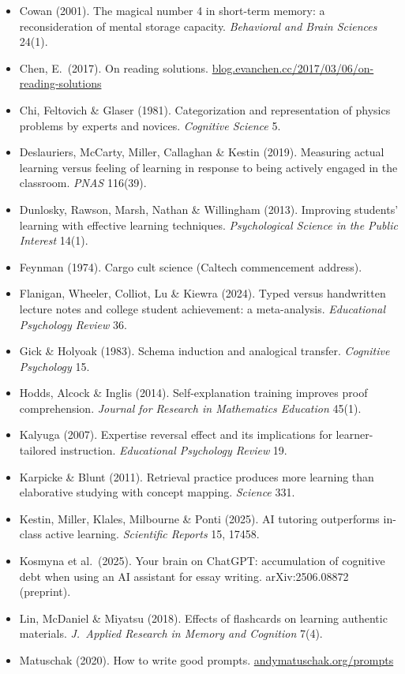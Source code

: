 \documentclass{kaelearn}
\newcommand\src[1]{\url{#1}}
\begin{document}
{\begin{itemize}
\item Cowan (2001). The magical number 4 in short-term memory: a reconsideration of mental storage capacity. \emph{Behavioral and Brain Sciences} 24(1).
\item Chen, E.\ (2017). On reading solutions. \src{blog.evanchen.cc/2017/03/06/on-reading-solutions}
\item Chi, Feltovich \& Glaser (1981). Categorization and representation of physics problems by experts and novices. \emph{Cognitive Science} 5.
\item Deslauriers, McCarty, Miller, Callaghan \& Kestin (2019). Measuring actual learning versus feeling of learning in response to being actively engaged in the classroom. \emph{PNAS} 116(39).
\item Dunlosky, Rawson, Marsh, Nathan \& Willingham (2013). Improving students' learning with effective learning techniques. \emph{Psychological Science in the Public Interest} 14(1).
\item Feynman (1974). Cargo cult science (Caltech commencement address).
\item Flanigan, Wheeler, Colliot, Lu \& Kiewra (2024). Typed versus handwritten lecture notes and college student achievement: a meta-analysis. \emph{Educational Psychology Review} 36.
\item Gick \& Holyoak (1983). Schema induction and analogical transfer. \emph{Cognitive Psychology} 15.
\item Hodds, Alcock \& Inglis (2014). Self-explanation training improves proof comprehension. \emph{Journal for Research in Mathematics Education} 45(1).
\item Kalyuga (2007). Expertise reversal effect and its implications for learner-tailored instruction. \emph{Educational Psychology Review} 19.
\item Karpicke \& Blunt (2011). Retrieval practice produces more learning than elaborative studying with concept mapping. \emph{Science} 331.
\item Kestin, Miller, Klales, Milbourne \& Ponti (2025). AI tutoring outperforms in-class active learning. \emph{Scientific Reports} 15, 17458.
\item Kosmyna et al.\ (2025). Your brain on ChatGPT: accumulation of cognitive debt when using an AI assistant for essay writing. arXiv:2506.08872 (preprint).
\item Lin, McDaniel \& Miyatsu (2018). Effects of flashcards on learning authentic materials. \emph{J.\ Applied Research in Memory and Cognition} 7(4).
\item Matuschak (2020). How to write good prompts. \src{andymatuschak.org/prompts}

\end{itemize}}
\end{document}

